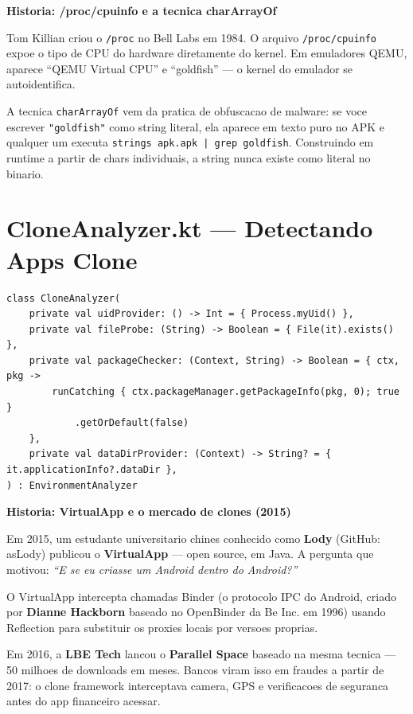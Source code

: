 \documentclass[12pt,a4paper]{article}
\begin{document}
\begin{historybox}
\textbf{Historia: /proc/cpuinfo e a tecnica charArrayOf}

Tom Killian criou o \texttt{/proc} no Bell Labs em 1984. O arquivo
\texttt{/proc/cpuinfo} expoe o tipo de CPU do hardware diretamente do kernel.
Em emuladores QEMU, aparece ``QEMU Virtual CPU'' e ``goldfish'' ---
o kernel do emulador se autoidentifica.

A tecnica \texttt{charArrayOf} vem da pratica de obfuscacao de malware:
se voce escrever \texttt{"goldfish"} como string literal, ela aparece em
texto puro no APK e qualquer um executa \texttt{strings apk.apk | grep goldfish}.
Construindo em runtime a partir de chars individuais, a string nunca
existe como literal no binario.
\end{historybox}

\newpage

\section{CloneAnalyzer.kt --- Detectando Apps Clone}

\begin{lstlisting}
class CloneAnalyzer(
    private val uidProvider: () -> Int = { Process.myUid() },
    private val fileProbe: (String) -> Boolean = { File(it).exists() },
    private val packageChecker: (Context, String) -> Boolean = { ctx, pkg ->
        runCatching { ctx.packageManager.getPackageInfo(pkg, 0); true }
            .getOrDefault(false)
    },
    private val dataDirProvider: (Context) -> String? = { it.applicationInfo?.dataDir },
) : EnvironmentAnalyzer
\end{lstlisting}

\begin{historybox}
\textbf{Historia: VirtualApp e o mercado de clones (2015)}

Em 2015, um estudante universitario chines conhecido como \textbf{Lody} (GitHub: asLody)
publicou o \textbf{VirtualApp} --- open source, em Java. A pergunta que motivou:
\textit{``E se eu criasse um Android dentro do Android?''}

O VirtualApp intercepta chamadas Binder (o protocolo IPC do Android, criado por
\textbf{Dianne Hackborn} baseado no OpenBinder da Be Inc. em 1996) usando Reflection
para substituir os proxies locais por versoes proprias.

Em 2016, a \textbf{LBE Tech} lancou o \textbf{Parallel Space} baseado na mesma
tecnica --- 50 milhoes de downloads em meses. Bancos viram isso em fraudes
a partir de 2017: o clone framework interceptava camera, GPS e verificacoes
de seguranca antes do app financeiro acessar.
\end{historybox}
\end{document}

